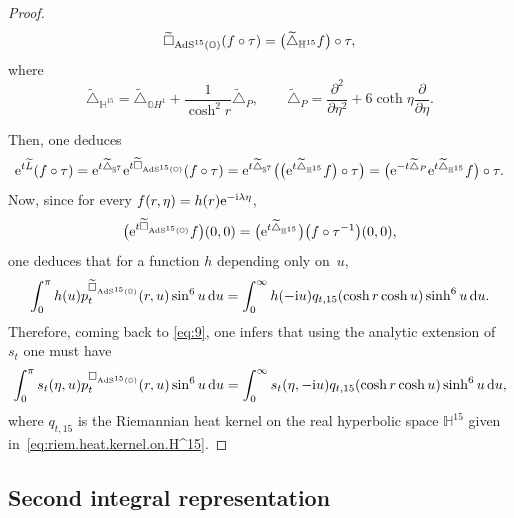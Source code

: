 \documentclass[10pt,a4paper]{amsart}
\numberwithin{equation}{section}
\begin{document}
\begin{proof}
\begin{equation*}
\widetilde{\square}_{{\rm AdS}^{15}(\mathbb{O})}(f\circ \tau)=\big(\widetilde{\triangle}_{\mathbb{H}^{15}}f\big)\circ \tau,
\end{equation*}
where
\begin{equation*}
\widetilde{\triangle}_{\mathbb{H}^{15}}=\widetilde{\triangle}_{\mathbb{O}H^1}+\frac{1}{\cosh^2 r}\widetilde{\triangle}_{P},\qquad \widetilde{\triangle}_{P}=\frac{{\partial}^2}{\partial {\eta}^2}+6\coth \eta\frac{{\partial}}{\partial {\eta}}.
\end{equation*}

Then, one deduces
\begin{equation*}
{\rm e}^{t\widetilde{L}}(f\circ \tau)={\rm e}^{t\widetilde{\triangle}_{\mathbb{S}^7}}{\rm e}^{t\widetilde{\square}_{{\rm AdS}^{15}(\mathbb{O})}}(f \circ \tau)={\rm e}^{t\widetilde{\triangle}_{\mathbb{S}^7}}\big(\big({\rm e}^{t{\widetilde{\triangle}_{\mathbb{H}^{15}}}}f\big) \circ \tau\big)=\big({\rm e}^{-t\widetilde{\triangle}_{P}}{\rm e}^{t{\widetilde{\triangle}_{\mathbb{H}^{15}}}}f\big) \circ \tau.
\end{equation*}
Now, since for every $f(r,\eta)=h(r){\rm e}^{-{\rm i}\lambda \eta}$,
\begin{equation*}
\big({\rm e}^{t\widetilde{\square}_{{\rm AdS}^{15}(\mathbb{O})}}f\big)(0,0)=\big({\rm e}^{t{\widetilde{\triangle}_{\mathbb{H}^{15}}}}\big)\big(f\circ \tau^{-1}\big)(0,0),
\end{equation*}
one deduces that for a function $h$ depending only on~$u$,
\begin{equation*}
\int_{0}^{\pi}h(u)p^{\widetilde{\square}_{{\rm AdS}^{15}(\mathbb{O})}}_t(r,u)\sin^6u\,{\rm d}u=\int_{0}^{\infty}h(-{\rm i}u)q_{t,15}(\cosh r \cosh u) \sinh^6u\,{\rm d}u.
\end{equation*}
Therefore, coming back to \eqref{eq:9}, one infers that using the analytic extension of~$s_t$ one must have
\begin{gather*}%
\int_{0}^{\pi}s_t(\eta,u)p^{\square_{{\rm AdS}^{15}(\mathbb{O})}}_t(r,u)\sin^6u\,{\rm d}u=\int_{0}^{\infty}s_t(\eta,-{\rm i}u)q_{t,15}(\cosh r \cosh u)\sinh^6u\,{\rm d}u,
\end{gather*}
where $q_{t,15}$ is the Riemannian heat kernel on the real hyperbolic space $\mathbb{H}^{15}$ given in~\eqref{eq:riem.heat.kernel.on.H^15}.
\end{proof}

\subsection{Second integral representation}\label{section4.2}
\end{document}
